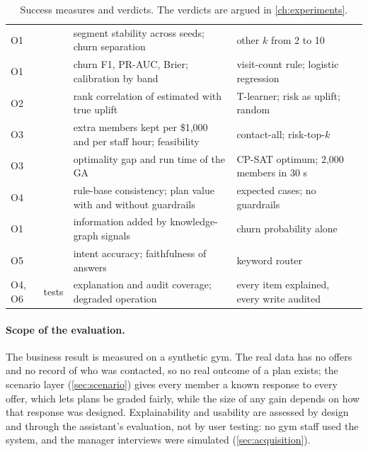 \begin{table}[tb]
  \caption{Success measures and verdicts. The verdicts are argued in \cref{ch:experiments}.}
  \label{tab:scorecard}
  \begin{tabularx}{\linewidth}{@{}l l L L l@{}}
    \toprule
    &  &  &  &  \\
    \midrule
    O1 &  & segment stability across seeds; churn separation & other $k$ from 2 to 10 &  \\
    O1 &  & churn F1, PR-AUC, Brier; calibration by band & visit-count rule; logistic regression &  \\
    O2 &  & rank correlation of estimated with true uplift & T-learner; risk as uplift; random &  \\
    O3 &  & extra members kept per \$1,000 and per staff hour; feasibility & contact-all; risk-top-$k$ &  \\
    O3 &  & optimality gap and run time of the GA & CP-SAT optimum; 2,000 members in 30 s &  \\
    O4 &  & rule-base consistency; plan value with and without guardrails & expected cases; no guardrails &  \\
    O1 &  & information added by knowledge-graph signals & churn probability alone &  \\
    O5 &  & intent accuracy; faithfulness of answers & keyword router &  \\
    O4, O6 & tests & explanation and audit coverage; degraded operation & every item explained, every write audited &  \\
    \bottomrule
  \end{tabularx}
\end{table}

\paragraph{Scope of the evaluation.} The business result is measured on a synthetic gym. The real data has no offers and no record of who was contacted, so no real outcome of a plan exists; the scenario layer (\cref{sec:scenario}) gives every member a known response to every offer, which lets plans be graded fairly, while the size of any gain depends on how that response was designed. Explainability and usability are assessed by design and through the assistant's evaluation, not by user testing: no gym staff used the system, and the manager interviews were simulated (\cref{sec:acquisition}).
